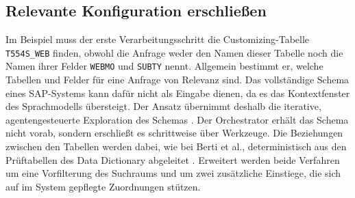 \subsection{Relevante Konfiguration erschließen}
\label{subsec:ta-erschliessen}

Im Beispiel muss der erste Verarbeitungsschritt die Customizing-Tabelle \texttt{T554S\_WEB} finden, obwohl die Anfrage weder den Namen dieser Tabelle noch die Namen ihrer Felder \texttt{WEBMO} und \texttt{SUBTY} nennt. Allgemein bestimmt er, welche Tabellen und Felder für eine Anfrage von Relevanz sind. Das vollständige Schema eines SAP-Systems kann dafür nicht als Eingabe dienen, da es das Kontextfenster des Sprachmodells übersteigt. Der Ansatz übernimmt deshalb die iterative, agentengesteuerte Exploration des Schemas \cite{wang_autolink_2026}. Der Orchestrator erhält das Schema nicht vorab, sondern erschließt es schrittweise über Werkzeuge. Die Beziehungen zwischen den Tabellen werden dabei, wie bei Berti et al., deterministisch aus den Prüftabellen des Data Dictionary abgeleitet \cite{berti_generic_2023}. Erweitert werden beide Verfahren um eine Vorfilterung des Suchraums und um zwei zusätzliche Einstiege, die sich auf im System gepflegte Zuordnungen stützen.


